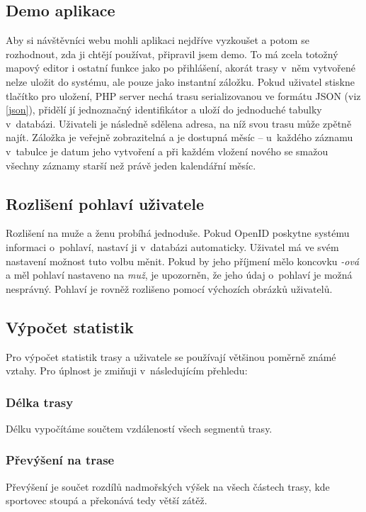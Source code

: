 \subsection{Demo aplikace}
Aby si návštěvníci webu mohli aplikaci nej\-dříve vyzkoušet a potom se
rozhodnout, zda ji chtějí používat, připravil jsem demo. To má zcela
totožný mapový editor i ostatní funkce jako po přihlášení, akorát
trasy v~něm vytvořené nelze uložit do systému, ale pouze jako
instantní záložku. Pokud uživatel stiskne tlačítko pro uložení, PHP
server nechá trasu serializovanou ve formátu JSON (viz \ref{json}),
přidělí jí jednoznačný identifikátor a uloží do jednoduché tabulky
v~databázi. Uživateli je následně sdělena adresa, na níž svou trasu
může zpětně najít. Záložka je veřejně zobrazitelná a je dostupná měsíc
-- u~každého záznamu v~tabulce je datum jeho vytvoření a při každém
vložení nového se smažou všechny záznamy starší než právě jeden
kalendářní měsíc.

\subsection{Rozlišení pohlaví uživatele}
Rozlišení na muže a ženu probíhá jednoduše. Pokud OpenID poskytne
systému informaci o~pohlaví, nastaví ji v~databázi automaticky.
Uživatel má ve svém nastavení možnost tuto volbu měnit. Pokud by jeho
příjmení mělo koncovku {\it -ová} a měl pohlaví nastaveno na {\it
muž}, je upozorněn, že jeho údaj o~pohlaví je možná nesprávný.
Pohlaví je rovněž rozlišeno pomocí výchozích obrázků uživatelů.

\subsection{Výpočet statistik}\label{statistiky}
Pro výpočet statistik trasy a uživatele se používají většinou poměrně
známé vztahy. Pro úplnost je zmiňuji v~následujícím přehledu:

\subsubsection{Délka trasy}
Délku vypočítáme součtem vzdáleností všech segmentů trasy.

\subsubsection{Převýšení na trase}
Převýšení je součet rozdílů nadmořských výšek na všech částech trasy,
kde sportovec stoupá a překonává tedy větší zátěž.

